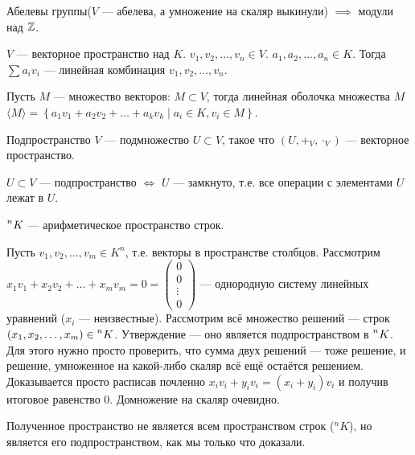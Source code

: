 \begin{remark}
	Абелевы группы($V$ --- абелева, а умножение на скаляр выкинули) $\implies$ модули над  $\mathbb{Z}$.
\end{remark}
\begin{definition}
    $V$ --- векторное пространство над  $K$. $v_1, v_2, \ldots, v_n \in V$. $a_1, a_2, \ldots, a_n \in K$. Тогда $\sum a_i v_i$ --- линейная комбинация  $v_1, v_2, \ldots, v_n$.
\end{definition}
\begin{definition}
    Пусть $M$ --- множество векторов: $M \subset V$, тогда линейная оболочка множества $M$ $\langle M \rangle = \left\{ a_1v_1 + a_2v_2 + \ldots + a_k v_k \mid a_i \in K, v_i \in M\right\}$.
\end{definition}
\begin{definition}
    Подпространство $V$ --- подмножество  $U \subset V$, такое что  $(U, +_V, \cdot_V)$ --- векторное пространство. 
\end{definition}
\begin{statement}
    $U \subset V$ --- подпространство  $\iff$ $U$ --- замкнуто, т.е. все операции с элементами  $U$ лежат в $U$.
\end{statement}
\begin{example}
    $\prescript{n}{}{K}$ --- арифметическое пространство строк.

    Пусть $v_1, v_2, \ldots, v_m \in K^n$, т.е. векторы в пространстве столбцов. Рассмотрим $x_1v_1+x_2v_2+\ldots+x_mv_m = 0 = \begin{pmatrix} 0 \\ 0 \\ \vdots \\ 0 \end{pmatrix}$ --- однородную систему линейных уравнений ($x_i$ --- неизвестные). Рассмотрим всё множество решений --- строк $(x_1, x_2, \ldots, x_m) \in \prescript{n}{}{K}$. Утверждение --- оно является подпространством в $\prescript{n}{}{K}$. Для этого нужно просто проверить, что сумма двух решений --- тоже решение, и решение, умноженное на какой-либо скаляр всё ещё остаётся решением. Доказывается просто расписав почленно $x_i v_i + y_i v_i = (x_i + y_i) v_i$ и получив итоговое равенство 0. Домножение на скаляр очевидно. 

    Полученное пространство не является всем пространством строк (${}^n K$), но является его подпространством, как мы только что доказали.
\end{example}
\slashn


